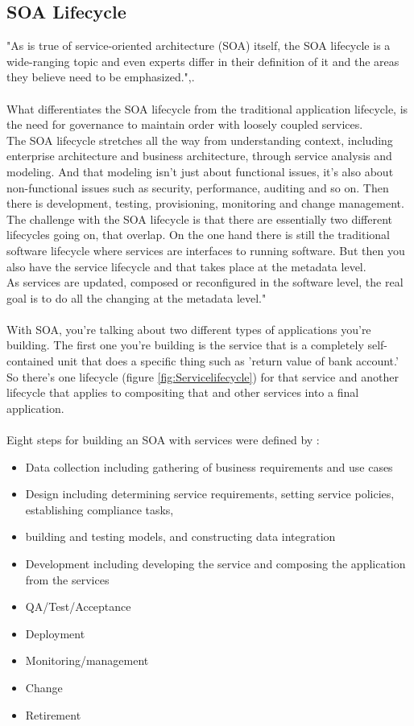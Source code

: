 \documentclass[12pt]{article}
\begin{document}
\subsection{SOA Lifecycle}
"As is true of service-oriented architecture (SOA) itself, the SOA lifecycle is a wide-ranging topic and even experts differ in their definition of it and the areas they believe need to be emphasized.",\cite{soalycman}.\\\\
What differentiates the SOA lifecycle from the traditional application lifecycle, is the need for governance to maintain order with loosely coupled services.\cite{soalycman}
\\
The SOA lifecycle stretches all the way from understanding context, including enterprise architecture and business architecture, through service analysis and modeling. And that modeling isn't just about functional issues, it's also about non-functional issues such as security, performance, auditing and so on. Then there is development, testing, provisioning, monitoring and change management. \cite{soalycman}\\
The challenge with the SOA lifecycle is that there are essentially two different lifecycles going on, that overlap. On the one hand there is still the traditional software lifecycle where services are interfaces to running software. But then you also have the service lifecycle and that takes place at the metadata level.\\
As services are updated, composed or reconfigured in the software level, the real goal is to do all the changing at the metadata level."\cite{soalycman}\\
\\
With SOA, you're talking about two different types of applications you're building. The first one you're building is the service that is a completely self-contained unit that does a specific thing such as 'return value of bank account.' So there's one lifecycle (figure \ref{fig:Servicelifecycle}) for that service and another lifecycle that applies to compositing that and other services into a final application. \cite{soalycman} \\
\\
Eight steps for building an SOA with services were defined by \cite{soalycman}:
\begin{itemize}
\item Data collection including gathering of business requirements and use cases
\item Design including determining service requirements, setting service policies, establishing compliance tasks, \item building and testing models, and constructing data integration
\item Development including developing the service and composing the application from the services
\item QA/Test/Acceptance
\item Deployment
\item Monitoring/management
\item Change
\item Retirement
\end{itemize}
\end{document}
